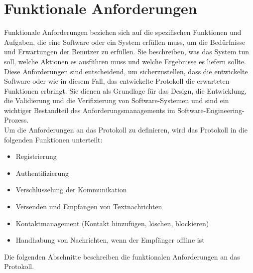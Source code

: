 \section{Funktionale Anforderungen}



Funktionale Anforderungen beziehen sich auf die spezifischen Funktionen und Aufgaben, 
die eine Software oder ein System erfüllen muss, um die Bedürfnisse und Erwartungen der Benutzer zu erfüllen.
Sie beschreiben, was das System tun soll, welche Aktionen es ausführen muss und welche 
Ergebnisse es liefern sollte. Diese Anforderungen sind entscheidend, um sicherzustellen, dass die entwickelte Software 
oder wie in diesem Fall, das entwickelte Protokoll die erwarteten Funktionen erbringt. Sie dienen 
als Grundlage für das Design, die Entwicklung, die Validierung und die Verifizierung von Software-Systemen und 
sind ein wichtiger Bestandteil des Anforderungsmanagements im Software-Engineering-Prozess.
\\
\noindent Um die Anforderungen an das Protokoll zu definieren, wird das Protokoll in die folgenden
Funktionen unterteilt:

\begin{itemize}
    \item Registrierung
    \item Authentifizierung
    \item Verschlüsselung der Kommunikation
    \item Versenden und Empfangen von Textnachrichten
    \item Kontaktmanagement (Kontakt hinzufügen, löschen, blockieren)
    \item Handhabung von Nachrichten, wenn der Empfänger offline ist
\end{itemize}

\noindent Die folgenden Abschnitte beschreiben die funktionalen Anforderungen an das Protokoll.
\\



 

%
%